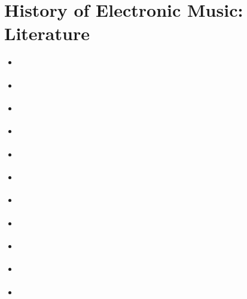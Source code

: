 
\chapter{History of Electronic Music: Literature}
\label{literature}

\begin{itemize}

\item \citep{boulanger2000csound}
\item \citep{chadabe1997electric}
\item \citep{emmerson07}
\item \citep{emmersonsmalleygrove2001}
\item \citep{emmerson1986language}
\item \citep{emmerson2000music}
\item \citep{manning2013electronic}
\item \citep{roads1996computer}
\item \citep{russolo1986art}
\item \citep{born1995rationalizing}
\item \citep{holmes2008electronic}


\end{itemize}
